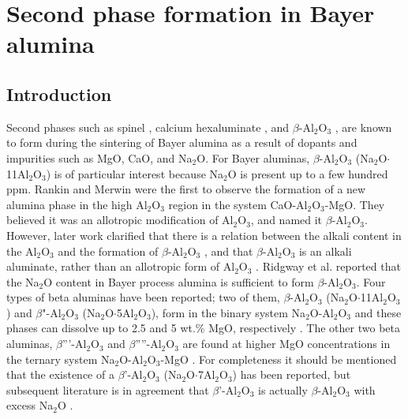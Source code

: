 \chapter{Second phase formation in Bayer alumina}

\section{Introduction}
Second phases such as spinel \cite{Zuo2013}, calcium hexaluminate \cite{Cinibulk1995}, and $\beta$-Al$_{2}$O$_{3}$ \cite{Duncan1969a}, are known to form during the sintering of Bayer alumina as a result of dopants and impurities such as MgO, CaO, and Na$_{2}$O. For Bayer aluminas, $\beta$-Al$_{2}$O$_{3}$ (Na$_{2}$O$\cdot$11Al$_{2}$O$_{3}$) is of particular interest because Na$_{2}$O is present up to a few hundred ppm. Rankin and Merwin \cite{Rankin1916} were the first to observe the formation of a new alumina phase in the high Al$_{2}$O$_{3}$ region in the system CaO-Al$_{2}$O$_{3}$-MgO. They believed it was an allotropic modification of Al$_{2}$O$_{3}$, and named it $\beta$-Al$_{2}$O$_{3}$. However, later work clarified that there is a relation between the alkali content in the Al$_{2}$O$_{3}$ and the formation of $\beta$-Al$_{2}$O$_{3}$ \cite{Stillwell1926}, and that $\beta$-Al$_{2}$O$_{3}$ is an alkali aluminate, rather than an allotropic form of Al$_{2}$O$_{3}$ \cite{Vries1969}. Ridgway et al. \cite{Ridgway1936} reported that the Na$_{2}$O content in Bayer process alumina is sufficient to form $\beta$-Al$_{2}$O$_{3}$. Four types of beta aluminas have been reported; two of them, $\beta$-Al$_{2}$O$_{3}$ (Na$_{2}$O$\cdot$11Al$_{2}$O$_{3}$) and $\beta$"-Al$_{2}$O$_{3}$ (Na$_{2}$O$\cdot$5Al$_{2}$O$_{3}$), form in the binary system Na$_{2}$O-Al$_{2}$O$_{3}$ and these phases can dissolve up to 2.5 and 5 wt.\% MgO, respectively \cite{Kummer1972a}. The other two beta aluminas, $\beta$'''-Al$_{2}$O$_{3}$ and $\beta$''''-Al$_{2}$O$_{3}$ are found at higher MgO concentrations in the ternary system Na$_{2}$O-Al$_{2}$O$_{3}$-MgO \cite{Kummer1972a,Stevens1984}. For completeness it should be mentioned that the existence of a $\beta$'-Al$_{2}$O$_{3}$ (Na$_{2}$O$\cdot$7Al$_{2}$O$_{3}$) has been reported, but subsequent literature is in agreement that $\beta$'-Al$_{2}$O$_{3}$ is actually $\beta$-Al$_{2}$O$_{3}$ with excess Na$_{2}$O \cite{Kummer1972a,Stevens1984}.

